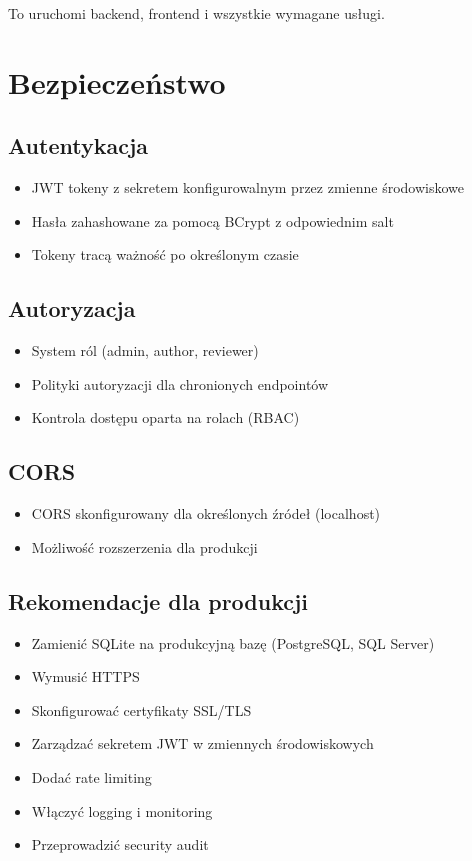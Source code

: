 \documentclass[times]{san}
\begin{document}
To uruchomi backend, frontend i wszystkie wymagane usługi.

\section{Bezpieczeństwo}

\subsection{Autentykacja}

\begin{itemize}
    \item JWT tokeny z sekretem konfigurowalnym przez zmienne środowiskowe
    \item Hasła zahashowane za pomocą BCrypt z odpowiednim salt
    \item Tokeny tracą ważność po określonym czasie
\end{itemize}

\subsection{Autoryzacja}

\begin{itemize}
    \item System ról (admin, author, reviewer)
    \item Polityki autoryzacji dla chronionych endpointów
    \item Kontrola dostępu oparta na rolach (RBAC)
\end{itemize}

\subsection{CORS}

\begin{itemize}
    \item CORS skonfigurowany dla określonych źródeł (localhost)
    \item Możliwość rozszerzenia dla produkcji
\end{itemize}

\subsection{Rekomendacje dla produkcji}

\begin{itemize}
    \item Zamienić SQLite na produkcyjną bazę (PostgreSQL, SQL Server)
    \item Wymusić HTTPS
    \item Skonfigurować certyfikaty SSL/TLS
    \item Zarządzać sekretem JWT w zmiennych środowiskowych
    \item Dodać rate limiting
    \item Włączyć logging i monitoring
    \item Przeprowadzić security audit
\end{itemize}
\end{document}

